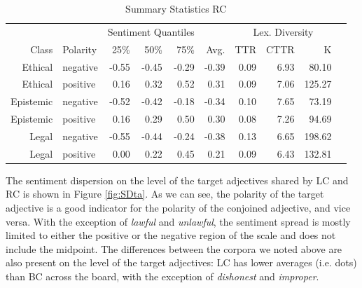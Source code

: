 \documentclass{article}
\begin{document}
\begin{table}[!h]
\centering
{}
\begin{tabular}{rlrrrrrrrr}
  & & \multicolumn{3}{c}{Sentiment Quantiles} & & \multicolumn{3}{c}{Lex. Diversity}\\
   \cmidrule{3-5} \cmidrule{7-9}
  Class & Polarity & 25\% & 50\% & 75\% & Avg. &  TTR & CTTR & K\\
  \bottomrule
    Ethical & negative & -0.55 & -0.45 & -0.29 & -0.39 & 0.09 & 6.93 & 80.10 \\ 
  Ethical & positive & 0.16 & 0.32 & 0.52 & 0.31 & 0.09 & 7.06 & 125.27 \\ 
Epistemic & negative & -0.52 & -0.42 & -0.18 & -0.34 & 0.10 & 7.65 & 73.19 \\ 
  Epistemic & positive & 0.16 & 0.29 & 0.50 & 0.30 & 0.08 & 7.26 & 94.69 \\ 
  Legal & negative & -0.55 & -0.44 & -0.24 & -0.38 & 0.13 & 6.65 & 198.62 \\ 
  Legal & positive & 0.00 & 0.22 & 0.45 & 0.21 & 0.09 & 6.43 & 132.81 \\ 
   \hline
\end{tabular}
   \caption{Summary Statistics RC}
   \label{tab:RCstats}
\end{table}

The sentiment dispersion on the level of the target adjectives shared by LC and RC is shown in Figure \ref{fig:SDta}. As we can see, the polarity of the target adjective is a good indicator for the polarity of the conjoined adjective, and vice versa. With the exception of \textit{lawful} and \textit{unlawful}, the sentiment spread is mostly limited to either the positive or the negative region of the scale and does not include the midpoint. The differences between the corpora we noted above are also present on the level of the target adjectives: LC has lower averages (i.e. dots) than BC across the board, with the exception of \textit{dishonest} and \textit{improper}. %
\end{document}
